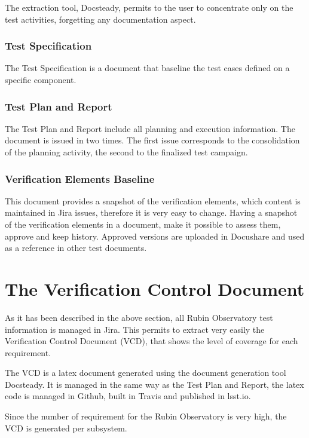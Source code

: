 The extraction tool, Docsteady, permits to the user to concentrate only on the test activities,
forgetting any documentation aspect.


\subsubsection{Test Specification}

The Test Specification is a document that baseline the test cases defined on a specific component.


\subsubsection{Test Plan and Report}

The Test Plan and Report include all planning and execution information. 
The document  is issued in two times. The first issue corresponds to the consolidation of the planning activity, 
the second to the finalized test campaign.


\subsubsection{Verification Elements Baseline}

This document provides a snapshot of the verification elements, which content is maintained in Jira issues, therefore it is very easy to change.
Having a snapshot of the verification elements in a document, make it possible to assess them, approve and keep history.
Approved versions are uploaded in Docushare and used as a reference in other test documents.


\section{The Verification Control Document}

As it has been described in the above section, all Rubin Observatory test information is managed in Jira. 
This permits to extract very easily the Verification Control Document (VCD), that shows the level of coverage for each requirement.

The VCD is a latex document generated using the document generation tool Docsteady. 
It is managed in the same way as the Test Plan and Report, the latex code is managed in Github,
built in Travis and published in lsst.io.

Since the number of requirement for the Rubin Observatory is very high, the VCD is generated per subsystem.

